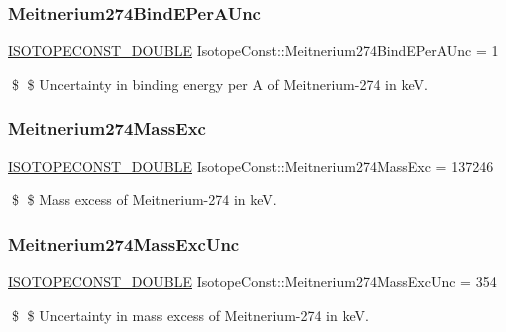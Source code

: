 \subsubsection{\texorpdfstring{Meitnerium274\+Bind\+E\+Per\+A\+Unc}{Meitnerium274BindEPerAUnc}}
{\footnotesize\ttfamily \mbox{\hyperlink{group___isotope_const-_macros_ga8f45a7272ce02c0b4c65c44636ed719a}{I\+S\+O\+T\+O\+P\+E\+C\+O\+N\+S\+T\+\_\+\+D\+O\+U\+B\+LE}} Isotope\+Const\+::\+Meitnerium274\+Bind\+E\+Per\+A\+Unc = 1}

\$ \$ Uncertainty in binding energy per A of Meitnerium-\/274 in keV. \mbox{\label{group___isotope_const-_meitnerium-_mt274_gae4fccbfdde86c1e17242dcf081588981}} 
\subsubsection{\texorpdfstring{Meitnerium274\+Mass\+Exc}{Meitnerium274MassExc}}
{\footnotesize\ttfamily \mbox{\hyperlink{group___isotope_const-_macros_ga8f45a7272ce02c0b4c65c44636ed719a}{I\+S\+O\+T\+O\+P\+E\+C\+O\+N\+S\+T\+\_\+\+D\+O\+U\+B\+LE}} Isotope\+Const\+::\+Meitnerium274\+Mass\+Exc = 137246}

\$ \$ Mass excess of Meitnerium-\/274 in keV. \mbox{\label{group___isotope_const-_meitnerium-_mt274_ga1e8fefcca8809170ec9a8b7fb7ba59aa}} 
\subsubsection{\texorpdfstring{Meitnerium274\+Mass\+Exc\+Unc}{Meitnerium274MassExcUnc}}
{\footnotesize\ttfamily \mbox{\hyperlink{group___isotope_const-_macros_ga8f45a7272ce02c0b4c65c44636ed719a}{I\+S\+O\+T\+O\+P\+E\+C\+O\+N\+S\+T\+\_\+\+D\+O\+U\+B\+LE}} Isotope\+Const\+::\+Meitnerium274\+Mass\+Exc\+Unc = 354}

\$ \$ Uncertainty in mass excess of Meitnerium-\/274 in keV. \mbox{\label{group___isotope_const-_meitnerium-_mt274_ga9ac1b54bad27524aadbe054e96f36e44}} 
